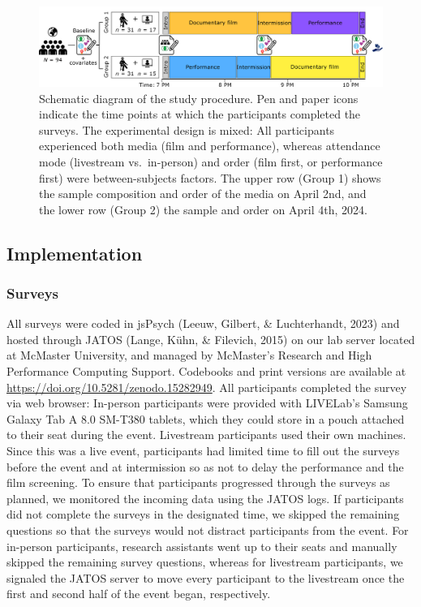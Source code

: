 \documentclass[
  man,floatsintext]{apa6}
\begin{document}
\begin{figure}
\includegraphics[width=1\linewidth]{images/Innocents_Diagram_StudyDesign} \caption{Schematic diagram of the study procedure. Pen and paper icons indicate the time points at which the participants completed the surveys. The experimental design is mixed: All participants experienced both media (film and performance), whereas attendance mode (livestream vs.~in-person) and order (film first, or performance first) were between-subjects factors. The upper row (Group 1) shows the sample composition and order of the media on April 2nd, and the lower row (Group 2) the sample and order on April 4th, 2024.}\label{fig:study-design}
\end{figure}

\subsection{Implementation}\label{implementation}

\subsubsection{Surveys}\label{surveys}

All surveys were coded in jsPsych (Leeuw, Gilbert, \& Luchterhandt, 2023) and hosted through JATOS (Lange, Kühn, \& Filevich, 2015) on our lab server located at McMaster University, and managed by McMaster's Research and High Performance Computing Support. Codebooks and print versions are available at \url{https://doi.org/10.5281/zenodo.15282949}. All participants completed the survey via web browser: In-person participants were provided with LIVELab's Samsung Galaxy Tab A 8.0 SM-T380 tablets, which they could store in a pouch attached to their seat during the event. Livestream participants used their own machines. Since this was a live event, participants had limited time to fill out the surveys before the event and at intermission so as not to delay the performance and the film screening. To ensure that participants progressed through the surveys as planned, we monitored the incoming data using the JATOS logs. If participants did not complete the surveys in the designated time, we skipped the remaining questions so that the surveys would not distract participants from the event. For in-person participants, research assistants went up to their seats and manually skipped the remaining survey questions, whereas for livestream participants, we signaled the JATOS server to move every participant to the livestream once the first and second half of the event began, respectively.
\end{document}
